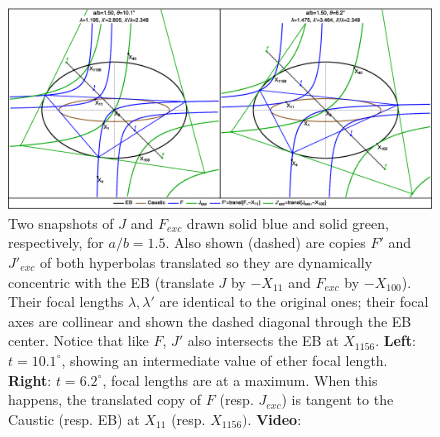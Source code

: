 \begin{figure}
    \centering
    \includegraphics[width=\textwidth]{pics_eps_new/0100_zero_hyps.eps}
    \caption{Two snapshots of $J$ and $F_{exc}$ drawn solid blue and solid green, respectively, for $a/b=1.5$. Also shown (dashed) are copies $F'$ and $J'_{exc}$ of both hyperbolas translated so they are dynamically concentric with the EB (translate $J$ by $-X_{11}$ and $F_{exc}$ by $-X_{100}$). Their focal lengths $\lambda,\lambda'$ are identical to the original ones; their focal axes are collinear and shown the dashed diagonal through the EB center. Notice that like $F$, $J'$ also intersects the EB at $X_{1156}$. \textbf{Left}: $t=10.1^\circ$, showing an intermediate value of ether focal length. \textbf{Right}: $t=6.2^\circ$, focal lengths are at a maximum. When this happens, the translated copy of $F$ (resp. $J_{exc}$) is tangent to the Caustic (resp. EB) at $X_{11}$ (resp. $X_{1156})$. \textbf{Video}: \cite[PL\#09,10]{reznik2020-playlist-circum}}
    \label{fig:zero-hyps}
\end{figure}

\